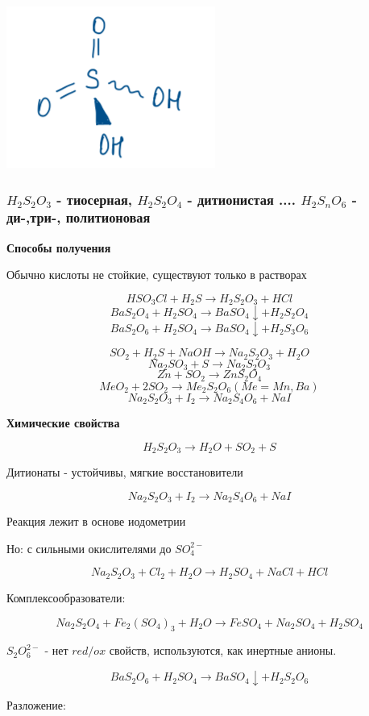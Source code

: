 \includegraphics{images/7v7.png}


\subsubsection*{$H_2S_2O_3$ - тиосерная, $H_2S_2O_4$ - дитионистая .... $H_2S_nO_6$ - ди-,три-, политионовая}


\textbf{Способы получения}

Обычно кислоты не стойкие, существуют только в растворах

$$HSO_3Cl + H_2S \rightarrow H_2S_2O_3 + HCl$$
$$BaS_2O_4 + H_2SO_4 \rightarrow BaSO_4\downarrow + H_2S_2O_4$$
$$BaS_2O_6 + H_2SO_4 \rightarrow BaSO_4\downarrow + H_2S_3O_6$$

$$SO_2 + H_2S + NaOH \rightarrow Na_2S_2O_3 + H_2O$$
$$Na_2SO_3 + S \rightarrow Na_2S_2O_3$$
$$Zn + SO_2 \rightarrow ZnS_2O_4$$
$$MeO_2 + 2SO_2 \rightarrow Me_2S_2O_6 (Me= Mn, Ba)$$
$$Na_2S_2O_3 +I_2 \rightarrow Na_2S_4O_6 + NaI$$

\textbf{Химические свойства}

$$H_2S_2O_3 \rightarrow H_2O + SO_2 + S$$ 

Дитионаты - устойчивы, мягкие восстановители

$$Na_2S_2O_3 + I_2 \rightarrow Na_2S_4O_6 + NaI$$

Реакция лежит в основе иодометрии

Но: с сильными окислителями до $SO_4^{2-}$

$$Na_2S_2O_3 + Cl_2 + H_2O \rightarrow H_2SO_4 + NaCl + HCl$$

Комплексообразователи:

$$Na_2S_2O_4 + Fe_2(SO_4)_3 + H_2O \rightarrow FeSO_4 + Na_2SO_4 + H_2SO_4$$

$S_2O_6^{2-}$ - нет $red/ox$ свойств, используются, как инертные анионы.

$$BaS_2O_6 + H_2SO_4 \rightarrow BaSO_4\downarrow + H_2S_2O_6$$

Разложение:

